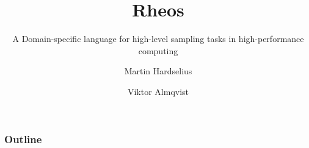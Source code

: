 \documentclass[10pt]{beamer}
\begin{document}
\title{Rheos}
\subtitle{A Domain-specific language for high-level sampling tasks in
  high-performance computing}
\author[Hardselius \and Almqvist]{Martin Hardselius \and Viktor Almqvist}


\begin{frame}
  \titlepage
\end{frame}


\begin{frame}
\frametitle{Outline}
\pause
\tableofcontents[pausesections]
\end{frame}








\end{document}
